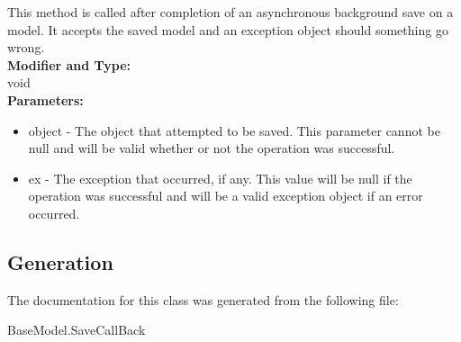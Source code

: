 This method is called after completion of an asynchronous background save on a model. It accepts the saved model and an exception object should something go wrong.\\

\textbf{Modifier and Type:}\\
\tab void\\

\textbf{Parameters:}\\
\begin{itemize}
\item object - The object that attempted to be saved. This parameter cannot be null and will be valid whether or not the operation was successful.
\item ex - The exception that occurred, if any. This value will be null if the operation was successful and will be a valid exception object if an error occurred.
\end{itemize}







\subsection{Generation}
The documentation for this class was generated from the following file\-:
\begin{DoxyCompactItemize}
\item BaseModel.SaveCallBack
\end{DoxyCompactItemize} 









